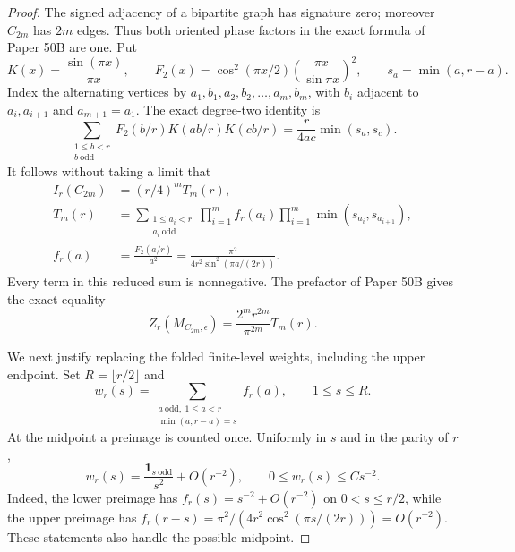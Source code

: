 \begin{proof}
The signed adjacency of a bipartite graph has signature zero; moreover
$C_{2m}$ has $2m$ edges. Thus both oriented phase factors in the exact
formula of Paper 50B are one. Put
\[
 K(x)=\frac{\sin(\pi x)}{\pi x},\qquad
 F_2(x)=\cos^2(\pi x/2)\left(\frac{\pi x}{\sin\pi x}\right)^2,
 \qquad s_a=\min(a,r-a).
\]
Index the alternating vertices by $a_1,b_1,a_2,b_2,\ldots,a_m,b_m$,
with $b_i$ adjacent to $a_i,a_{i+1}$ and $a_{m+1}=a_1$.
The exact degree-two identity is
\[
 \sum_{\substack{1\leq b<r\\b\ \mathrm{odd}}}
 F_2(b/r)K(ab/r)K(cb/r)
 =\frac{r}{4ac}\min(s_a,s_c).
\]
It follows without taking a limit that
\begin{align*}
 I_r(C_{2m})&=(r/4)^m T_m(r),\\
 T_m(r)&=\sum_{\substack{1\leq a_i<r\\a_i\ \mathrm{odd}}}
 \prod_{i=1}^m f_r(a_i)\prod_{i=1}^m\min(s_{a_i},s_{a_{i+1}}),\\
 f_r(a)&=\frac{F_2(a/r)}{a^2}
 =\frac{\pi^2}{4r^2\sin^2(\pi a/(2r))}.
\end{align*}
Every term in this reduced sum is nonnegative. The prefactor of
Paper 50B gives the exact equality
\begin{equation}\label{eq:cycle-exact}
 Z_r(M_{C_{2m},\epsilon})
 =\frac{2^m r^{2m}}{\pi^{2m}}T_m(r).
\end{equation}

We next justify replacing the folded finite-level weights, including
the upper endpoint. Set $R=\lfloor r/2\rfloor$ and
\[
 w_r(s)=\sum_{\substack{a\ \mathrm{odd},\ 1\leq a<r\\
                         \min(a,r-a)=s}} f_r(a),\qquad 1\leq s\leq R.
\]
At the midpoint a preimage is counted once. Uniformly in $s$ and in
the parity of $r$,
\begin{equation}\label{eq:fold-weight}
 w_r(s)=\frac{\mathbf1_{s\ \mathrm{odd}}}{s^2}
             +O(r^{-2}),\qquad 0\leq w_r(s)\leq C s^{-2}.
\end{equation}
Indeed, the lower preimage has $f_r(s)=s^{-2}+O(r^{-2})$ on
$0<s\leq r/2$, while the upper preimage has
$f_r(r-s)=\pi^2/(4r^2\cos^2(\pi s/(2r)))=O(r^{-2})$.
These statements also handle the possible midpoint.


\end{proof}
